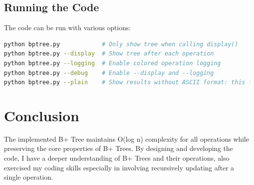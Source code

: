 \documentclass[11pt]{article}
\begin{document}
\subsection{Running the Code}
The code can be run with various options:
\begin{lstlisting}[language=bash]
python bptree.py            # Only show tree when calling display()
python bptree.py --display  # Show tree after each operation
python bptree.py --logging  # Enable colored operation logging
python bptree.py --debug    # Enable --display and --logging
python bptree.py --plain    # Show results without ASCII format: this format aligns the assignment requirement, compatible with other options
\end{lstlisting}

\section{Conclusion}
The implemented B+ Tree maintains O(log n) complexity for all operations while preserving the core properties of B+ Trees. By designing and developing the code, I have a deeper understanding of B+ Trees and their operations, also exercised my coding skills especially in involving recursively updating after a single operation.
\end{document}
